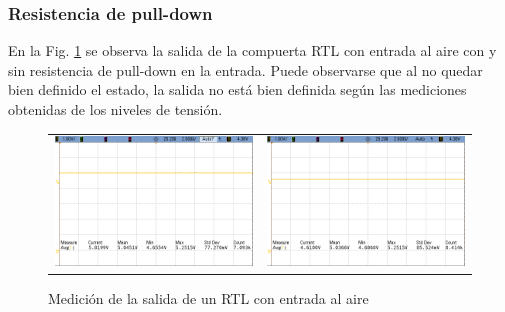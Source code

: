 \subsubsection{Resistencia de pull-down}
En la Fig. \ref{fig:pull_down_error} se observa la salida de la compuerta RTL con entrada al aire con y sin resistencia de pull-down en la entrada. Puede observarse que al no quedar bien definido el estado,
la salida no est\'a bien definida seg\'un las mediciones obtenidas de los niveles de tensi\'on.

\begin{figure}[H]
    \centering
    \begin{tabular}{c c}
        \includegraphics[scale=0.2]{../EJ1/Mediciones/Osciloscopio/Observaciones/Pull_down_error/cropped_scope_14.png} & 
        \includegraphics[scale=0.2]{../EJ1/Mediciones/Osciloscopio/Observaciones/Pull_down_error/cropped_scope_15.png}
    \end{tabular}
    \caption{Medici\'on de la salida de un RTL con entrada al aire}
    \label{fig:pull_down_error}
\end{figure}

